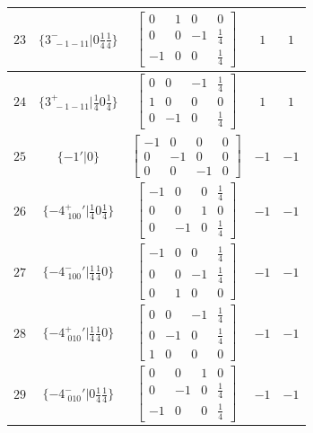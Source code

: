 \documentclass[fleqn,8pt]{jsarticle}
\begin{document}
\begin{longtable}{ccccc}
$ 23 $ & $ \{3^{-}_{\,\,-1-11}|0 \frac{1}{4} \frac{1}{4}\} $ & $ \begin{bmatrix} 0 & 1 & 0 & 0 \\ 0 & 0 & -1 & \frac{1}{4} \\ -1 & 0 & 0 & \frac{1}{4} \end{bmatrix} $ & $ 1 $ & $ 1 $ \\ \hline
$ 24 $ & $ \{3^{+}_{\,\,-1-11}|\frac{1}{4} 0 \frac{1}{4}\} $ & $ \begin{bmatrix} 0 & 0 & -1 & \frac{1}{4} \\ 1 & 0 & 0 & 0 \\ 0 & -1 & 0 & \frac{1}{4} \end{bmatrix} $ & $ 1 $ & $ 1 $ \\ \hline
$ 25 $ & $ \{-1{}'|0\} $ & $ \begin{bmatrix} -1 & 0 & 0 & 0 \\ 0 & -1 & 0 & 0 \\ 0 & 0 & -1 & 0 \end{bmatrix} $ & $ -1 $ & $ -1 $ \\ \hline
$ 26 $ & $ \{-4^{+}_{\,\,100}{}'|\frac{1}{4} 0 \frac{1}{4}\} $ & $ \begin{bmatrix} -1 & 0 & 0 & \frac{1}{4} \\ 0 & 0 & 1 & 0 \\ 0 & -1 & 0 & \frac{1}{4} \end{bmatrix} $ & $ -1 $ & $ -1 $ \\ \hline
$ 27 $ & $ \{-4^{-}_{\,\,100}{}'|\frac{1}{4} \frac{1}{4} 0\} $ & $ \begin{bmatrix} -1 & 0 & 0 & \frac{1}{4} \\ 0 & 0 & -1 & \frac{1}{4} \\ 0 & 1 & 0 & 0 \end{bmatrix} $ & $ -1 $ & $ -1 $ \\ \hline
$ 28 $ & $ \{-4^{+}_{\,\,010}{}'|\frac{1}{4} \frac{1}{4} 0\} $ & $ \begin{bmatrix} 0 & 0 & -1 & \frac{1}{4} \\ 0 & -1 & 0 & \frac{1}{4} \\ 1 & 0 & 0 & 0 \end{bmatrix} $ & $ -1 $ & $ -1 $ \\ \hline
$ 29 $ & $ \{-4^{-}_{\,\,010}{}'|0 \frac{1}{4} \frac{1}{4}\} $ & $ \begin{bmatrix} 0 & 0 & 1 & 0 \\ 0 & -1 & 0 & \frac{1}{4} \\ -1 & 0 & 0 & \frac{1}{4} \end{bmatrix} $ & $ -1 $ & $ -1 $ \\ \hline

\end{longtable}
\end{document}
